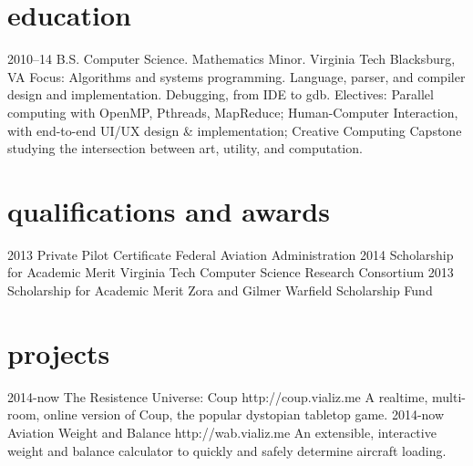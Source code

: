 \documentclass[]{cv-style}          %
\begin{document}

\section{education}

\begin{entrylist}
\entry
{2010--14}
{B.S. Computer Science. Mathematics Minor. {\normalfont Virginia Tech}}
{Blacksburg, VA}
{Focus: Algorithms and systems programming. Language, parser, and compiler design and implementation. Debugging, from IDE to gdb. Electives: Parallel computing with OpenMP, Pthreads, MapReduce; Human-Computer Interaction, with end-to-end UI/UX design \& implementation; Creative Computing Capstone studying the intersection between art, utility, and computation.}
\end{entrylist}


\section{qualifications and awards}
\begin{entrylist}
\entry
{2013}
{Private Pilot Certificate}
{Federal Aviation Administration}
{\vspace{-1.0cm}}
\entry
{2014}
{Scholarship for Academic Merit}
{Virginia Tech Computer Science Research Consortium}
{\vspace{-1.0cm}}
\entry
{2013}
{Scholarship for Academic Merit}
{Zora and Gilmer Warfield Scholarship Fund}
{\vspace{-1.0cm}}
\end{entrylist}


\section{projects}
\begin{entrylist}
\entry
{2014-now}
{The Resistence Universe: Coup}
{http://coup.vializ.me}
{A realtime, multi-room, online version of Coup, the popular dystopian tabletop game.}
\entry
{2014-now}
{Aviation Weight and Balance}
{http://wab.vializ.me}
{An extensible, interactive weight and balance calculator to quickly and safely determine aircraft loading.}
\end{entrylist}

\end{document}
